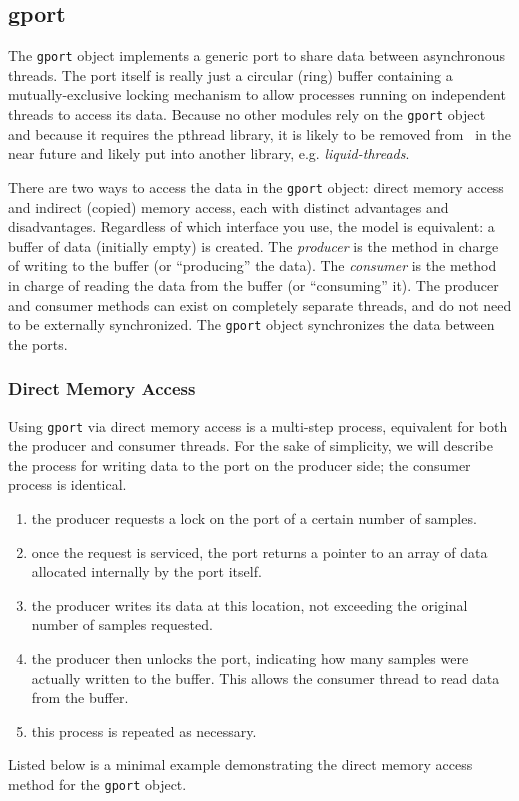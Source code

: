 %
%
\subsection{gport}
\label{module:buffer:gport}
The {\tt gport} object implements a generic port to share data between
asynchronous threads.
The port itself is really just a circular (ring) buffer containing a
mutually-exclusive locking mechanism to allow processes running on independent
threads to access its data.
Because no other modules rely on the {\tt gport} object and because it
requires the pthread library, it is likely to be removed from \liquid\ in the
near future and likely put into another library, e.g. {\em liquid-threads}.

There are two ways to access the data in the {\tt gport} object: direct memory
access and indirect (copied) memory access, each with distinct advantages and
disadvantages.
Regardless of which interface you use, the model is equivalent:
a buffer of data (initially empty) is created.
The {\it producer} is the method in charge of writing to the buffer (or
``producing'' the data).
The {\it consumer} is the method in charge of reading the data from the buffer
(or ``consuming'' it).
The producer and consumer methods can exist on completely separate threads,
and do not need to be externally synchronized.
The {\tt gport} object synchronizes the data between the ports.

\subsubsection{Direct Memory Access}
Using {\tt gport} via direct memory access is a multi-step process, equivalent
for both the producer and consumer threads.
For the sake of simplicity, we will describe the process for writing data to
the port on the producer side; the consumer process is identical.
%
\begin{enumerate}
\item the producer requests a lock on the port of a certain number of samples.
\item once the request is serviced, the port returns a pointer to an array of
      data allocated internally by the port itself.
\item the producer writes its data at this location, not exceeding the
      original number of samples requested.
\item the producer then unlocks the port, indicating how many samples were
      actually written to the buffer.
      This allows the consumer thread to read data from the buffer.
\item this process is repeated as necessary.
\end{enumerate}
%
Listed below is a minimal example demonstrating the direct memory access
method for the {\tt gport} object.
%

%

